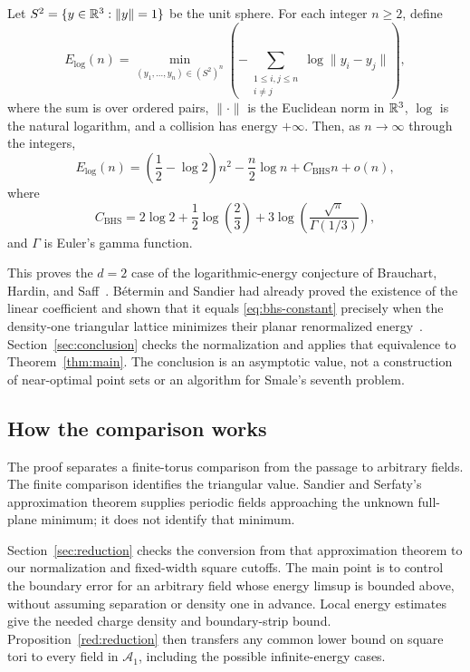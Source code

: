 \begin{corollary}\label{cor:bhs}
Let $S^2=\{y\in\mathbb R^3:\|y\|=1\}$ be the unit sphere. For each integer
$n\ge2$, define
\[
E_{\log}(n)=\min_{(y_1,\ldots,y_n)\in(S^2)^n}
 \left(-\sum_{\substack{1\le i,j\le n\\i\ne j}}
              \log\|y_i-y_j\|\right),
\]
where the sum is over ordered pairs, $\|\cdot\|$ is the Euclidean norm
in $\mathbb R^3$, $\log$ is the natural logarithm, and a collision has energy
$+\infty$. Then, as $n\to\infty$ through the integers,
\begin{equation}\label{eq:bhs-asymptotic}
E_{\log}(n)=\left(\frac12-\log2\right)n^2
             -\frac n2\log n+C_{\mathrm{BHS}}n+o(n),
\end{equation}
where
\begin{equation}\label{eq:bhs-constant}
C_{\mathrm{BHS}}
=2\log2+\frac12\log\!\left(\frac23\right)
       +3\log\!\left(\frac{\sqrt\pi}{\Gamma(1/3)}\right),
\end{equation}
and $\Gamma$ is Euler's gamma function.
\end{corollary}

This proves the $d=2$ case of the logarithmic-energy conjecture of
Brauchart, Hardin, and Saff~\cite[Conjecture~4]{BrauchartHardinSaff2012}.
B\'etermin and Sandier had already proved the existence of the linear
coefficient and shown that it equals \eqref{eq:bhs-constant} precisely
when the density-one triangular lattice minimizes their planar
renormalized energy~\cite[Theorem~1.5]{BeterminSandier2018}.
Section~\ref{sec:conclusion} checks the normalization and applies that
equivalence to Theorem~\ref{thm:main}. The conclusion is an asymptotic
value, not a construction of near-optimal point sets or an algorithm for
Smale's seventh problem.



\subsection{How the comparison works}

The proof separates a finite-torus comparison from the passage to
arbitrary fields.  The finite comparison identifies the triangular
value.  Sandier and Serfaty's approximation theorem supplies periodic
fields approaching the unknown full-plane minimum; it does not identify
that minimum.

Section~\ref{sec:reduction} checks the conversion from that approximation
theorem to our normalization and fixed-width square cutoffs.  The main
point is to control the boundary error for an arbitrary field whose
energy limsup is bounded above, without assuming separation or density
one in advance. Local energy estimates give the needed charge density
and boundary-strip bound. Proposition~\ref{red:reduction} then transfers
any common lower bound on square tori to every field in $\mathcal A_1$,
including the possible infinite-energy cases.

